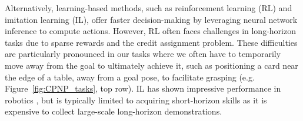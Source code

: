
Alternatively, learning-based methods, such as reinforcement learning (RL) and imitation learning (IL), offer faster decision-making by leveraging neural network inference to compute actions.  However, RL often faces challenges in long-horizon tasks due to sparse rewards and the credit assignment problem. These difficulties are particularly pronounced in our tasks where we often have to temporarily move away from the goal to ultimately achieve it, such as positioning a card near the edge of a table, away from a goal pose, to facilitate grasping (e.g. Figure~\ref{fig:CPNP_tasks}, top row). IL has shown impressive performance in robotics \cite{chi2023diffusion, fu2024mobile, Reuss-RSS-23, wang2023mimicplay,Zhao-RSS-23}, but is typically limited to acquiring short-horizon skills as it is expensive to collect large-scale long-horizon demonstrations.




